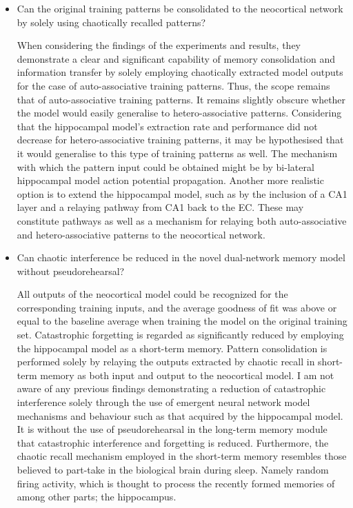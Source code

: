 \begin{itemize}
    \item Can the original training patterns be consolidated to the neocortical network by solely using chaotically recalled patterns?
    
    When considering the findings of the experiments and results, they demonstrate a clear and significant capability of memory consolidation and information transfer by solely employing chaotically extracted model outputs for the case of auto-associative training patterns. Thus, the scope remains that of auto-associative training patterns. It remains slightly obscure whether the model would easily generalise to hetero-associative patterns. Considering that the hippocampal model's extraction rate and performance did not decrease for hetero-associative training patterns, it may be hypothesised that it would generalise to this type of training patterns as well. The mechanism with which the pattern input could be obtained might be by bi-lateral hippocampal model action potential propagation. Another more realistic option is to extend the hippocampal model, such as by the inclusion of a CA1 layer and a relaying pathway from CA1 back to the EC. These may constitute pathways as well as a mechanism for relaying both auto-associative and hetero-associative patterns to the neocortical network.
    
    \item Can chaotic interference be reduced in the novel dual-network memory model without pseudorehearsal?
    
    All outputs of the neocortical model could be recognized for the corresponding training inputs, and the average goodness of fit was above or equal to the baseline average when training the model on the original training set. Catastrophic forgetting is regarded as significantly reduced by employing the hippocampal model as a short-term memory. Pattern consolidation is performed solely by relaying the outputs extracted by chaotic recall in short-term memory as both input and output to the neocortical model. I am not aware of any previous findings demonstrating a reduction of catastrophic interference solely through the use of emergent neural network model mechanisms and behaviour such as that acquired by the hippocampal model. It is without the use of pseudorehearsal in the long-term memory module that catastrophic interference and forgetting is reduced. Furthermore, the chaotic recall mechanism employed in the short-term memory resembles those believed to part-take in the biological brain during sleep. Namely random firing activity, which is thought to process the recently formed memories of among other parts; the hippocampus.
    
\end{itemize}

